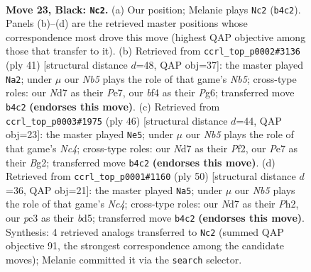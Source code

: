 \documentclass[11pt]{article}
\begin{document}
\clearpage

\begin{figure}[p]\centering
\begin{subfigure}{0.46\textwidth}\centering
\resizebox{\linewidth}{!}{%
\newchessgame
\chessboard[
  setfen={3k2r1/Nppnp2p/6p1/p7/1n3B1P/2P2P2/P3KP2/R7 b - - 0 23},
  showmover=false,
  pgfstyle=straightmove, color=movearrow, markmove={b4-c2}
]}
\caption{}
\end{subfigure}\hfill
\begin{subfigure}{0.46\textwidth}\centering
\resizebox{\linewidth}{!}{%
\newchessgame
\chessboard[
  setfen={3r1k2/p3pp1p/6p1/8/1n6/P1P1PP2/4BP1P/4R1K1 b - - 0 21},
  showmover=false,
  pgfstyle=straightmove, color=movearrow, markmove={b4-a2}
]}
\caption{}
\end{subfigure}
\\[4pt]
\begin{subfigure}{0.46\textwidth}\centering
\resizebox{\linewidth}{!}{%
\newchessgame
\chessboard[
  setfen={3rn1k1/p5pp/bp6/2pP1p2/2N5/1P4P1/P4PBP/2R3K1 w - - 0 24},
  showmover=false,
  pgfstyle=straightmove, color=movearrow, markmove={c4-e5}
]}
\caption{}
\end{subfigure}\hfill
\begin{subfigure}{0.46\textwidth}\centering
\resizebox{\linewidth}{!}{%
\newchessgame
\chessboard[
  setfen={2k1r3/p1pp2pp/8/2pb4/2N3P1/2PP4/P1P3PP/5RK1 w - - 1 26},
  showmover=false,
  pgfstyle=straightmove, color=movearrow, markmove={c4-a5}
]}
\caption{}
\end{subfigure}
\caption{\textbf{Move 23, Black: \texttt{Nc2}.} (a) Our position; Melanie plays \texttt{Nc2} (\texttt{b4c2}). Panels (b)--(d) are the retrieved master positions whose correspondence most drove this move (highest QAP objective among those that transfer to it). (b) Retrieved from \texttt{ccrl\_top\_p0002\#3136} (ply 41) [structural distance $d$=48, QAP obj=37]: the master played \texttt{Na2}; under $\mu$ our \emph{Nb5} plays the role of that game's \emph{Nb5}; cross-type roles: our \emph{N}d7 as their \emph{P}e7, our \emph{b}f4 as their \emph{P}g6; transferred move \texttt{b4c2} \textbf{(endorses this move)}. (c) Retrieved from \texttt{ccrl\_top\_p0003\#1975} (ply 46) [structural distance $d$=44, QAP obj=23]: the master played \texttt{Ne5}; under $\mu$ our \emph{Nb5} plays the role of that game's \emph{Nc4}; cross-type roles: our \emph{N}d7 as their \emph{P}f2, our \emph{P}e7 as their \emph{B}g2; transferred move \texttt{b4c2} \textbf{(endorses this move)}. (d) Retrieved from \texttt{ccrl\_top\_p0001\#1160} (ply 50) [structural distance $d$=36, QAP obj=21]: the master played \texttt{Na5}; under $\mu$ our \emph{Nb5} plays the role of that game's \emph{Nc4}; cross-type roles: our \emph{N}d7 as their \emph{P}h2, our \emph{p}c3 as their \emph{b}d5; transferred move \texttt{b4c2} \textbf{(endorses this move)}. Synthesis: 4 retrieved analogs transferred to \texttt{Nc2} (summed QAP objective 91, the strongest correspondence among the candidate moves); Melanie committed it via the \texttt{search} selector.}
\label{fig:thought-m45}
\end{figure}
\end{document}
